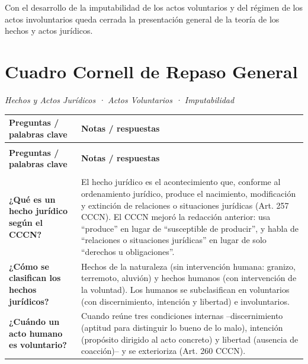 \documentclass[12pt,oneside]{book}
\begin{document}
Con el desarrollo de la imputabilidad de los actos voluntarios y del régimen de los actos involuntarios queda cerrada la presentación general de la teoría de los hechos y actos jurídicos.

\chapter*{Cuadro Cornell de Repaso General}

\textit{Hechos y Actos Jurídicos · Actos Voluntarios · Imputabilidad}

\begin{longtable}{
    >{\raggedright\arraybackslash}p{}
    >{\raggedright\arraybackslash}p{}
}
\toprule
\textbf{Preguntas / palabras clave} &
\textbf{Notas / respuestas} \\
\midrule
\endfirsthead
\multicolumn{2}{l}{\textit{Cuadro Cornell de Repaso General (continuación)}} \\
\toprule
\textbf{Preguntas / palabras clave} &
\textbf{Notas / respuestas} \\
\midrule
\endhead
\midrule
\multicolumn{2}{r}{\textit{Continúa en la página siguiente}} \\
\endfoot
\bottomrule
\endlastfoot

\textbf{¿Qué es un hecho jurídico según el CCCN?} &
El hecho jurídico es el acontecimiento que, conforme al ordenamiento jurídico, produce el nacimiento, modificación y extinción de relaciones o situaciones jurídicas (Art. 257 CCCN). El CCCN mejoró la redacción anterior: usa ``produce'' en lugar de ``susceptible de producir'', y habla de ``relaciones o situaciones jurídicas'' en lugar de solo ``derechos u obligaciones''. \\

\textbf{¿Cómo se clasifican los hechos jurídicos?} &
Hechos de la naturaleza (sin intervención humana: granizo, terremoto, aluvión) y hechos humanos (con intervención de la voluntad). Los humanos se subclasifican en voluntarios (con discernimiento, intención y libertad) e involuntarios. \\

\textbf{¿Cuándo un acto humano es voluntario?} &
Cuando reúne tres condiciones internas --discernimiento (aptitud para distinguir lo bueno de lo malo), intención (propósito dirigido al acto concreto) y libertad (ausencia de coacción)-- y se exterioriza (Art. 260 CCCN). \\


\end{longtable}
\end{document}
